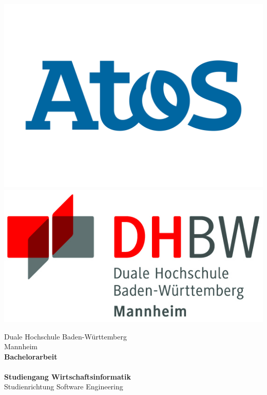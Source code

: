 \begin{titlepage}
\begin{minipage}{\textwidth}
		\vspace{-2cm}
		\noindent \includegraphics[scale=0.1]{img/Logo-Atos.jpg} \hfill   \includegraphics{img/logo.jpg}
\end{minipage}
\vspace{1em}
\sffamily
\begin{center}
	\textsf{\large{}Duale Hochschule Baden-W\"urttemberg\\[1.5mm] Mannheim}\\[2em]
	\textsf{\textbf{\Large{}Bachelorarbeit}}\\[3mm]
	\textsf{\textbf{\DerTitelDerArbeit}} \\[1.5cm]
	\textsf{\textbf{\Large{}Studiengang Wirtschaftsinformatik}\\[3mm] \textsf{Studienrichtung Software Engineering}}
	
	\vspace{3em}
\vfill


\end{center}
\end{titlepage}
